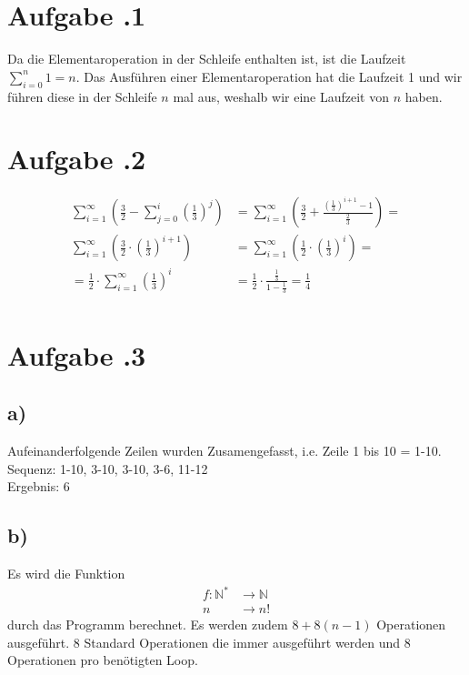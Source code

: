 \documentclass[12pt,german,a4paper]{article}
\author{Giovanni Ngodji Djeuha, Mike Lenz, Jonas Tesfamariam,\\ Bastian Schmitt, Luca Winterkamp}
\begin{document}
	\maketitle
	\section*{Aufgabe \bn.1} 
	
	Da die Elementaroperation in der Schleife enthalten ist, ist die Laufzeit $ \sum ^{ n } _{ i=0 } 1=n $. Das Ausführen einer Elementaroperation hat die Laufzeit 1 und wir führen diese in der Schleife $n$ mal aus, weshalb wir eine Laufzeit von $n$ haben.
	\newpage
	\section*{Aufgabe \bn.2}
	\begin{align*}
	\sum ^{ \infty } _{ i=1 } \left( \frac{ 3 }{ 2 } - \sum ^{ i } _{ j=0 }\left(\frac{ 1 }{ 3 } \right) ^{ j } \right) &= \sum ^{ \infty } _{ i=1 } \left( \frac{ 3 }{ 2 } + \frac{ (\frac{ 1 }{ 3 }) ^{ i+1 } -1  }{ \frac{ 2 }{ 3 }  }  \right) = \\
  \sum ^{ \infty } _{ i=1 } \left( \frac{ 3 }{ 2 } \cdot \left( \frac{ 1 }{ 3 } \right)^{ i+1 }  \right) &= \sum ^{ \infty } _{ i=1 } \left( \frac{ 1 }{ 2 } \cdot \left( \frac{ 1 }{ 3 } \right)^{ i }  \right)= \\
	= \frac{ 1 }{ 2 } \cdot \sum ^{ \infty } _{ i=1 } \left( \frac{ 1 }{ 3 } \right)^{ i } &= \frac{ 1 }{ 2 } \cdot \frac{ \frac{ 1 }{ 3 } }{ 1-\frac{ 1 }{ 3 } } = \frac{ 1 }{ 4 }  \\
	\end{align*}
  \newpage
	\section*{Aufgabe \bn.3}  
	\subsection*{a)}
	Aufeinanderfolgende Zeilen wurden Zusamengefasst, i.e. Zeile 1 bis 10 = 1-10.\\
	Sequenz: 1-10, 3-10, 3-10, 3-6, 11-12 \\
	Ergebnis: 6
	\subsection*{b)}
	Es wird die Funktion
	\begin{align*}
	f:\mathbb{N} ^{ * } &\rightarrow \mathbb{N} \\
	n &\rightarrow n!
	\end{align*}
	durch das Programm berechnet. Es werden zudem $8+8(n-1)$ Operationen ausgeführt. 8 Standard Operationen die immer ausgeführt werden und 8 Operationen pro benötigten Loop.
\end{document}
